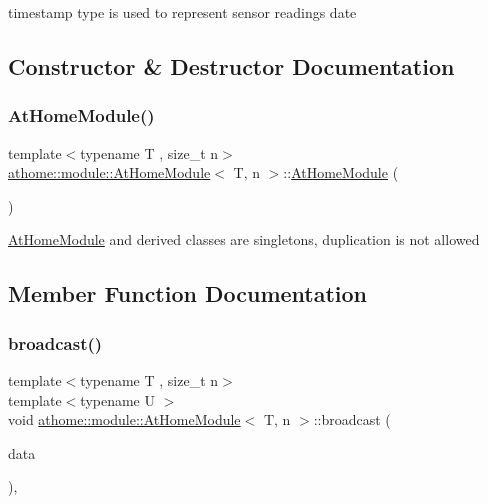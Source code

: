 {\ttfamily timestamp} type is used to represent sensor readings date 

\subsection{Constructor \& Destructor Documentation}
\mbox{\label{classathome_1_1module_1_1_at_home_module_ad78045943a579874ec16e14cf976eada}} 
\subsubsection{\texorpdfstring{At\+Home\+Module()}{AtHomeModule()}}
{\footnotesize\ttfamily template$<$typename T , size\+\_\+t n$>$ \\
\mbox{\hyperlink{classathome_1_1module_1_1_at_home_module}{athome\+::module\+::\+At\+Home\+Module}}$<$ T, n $>$\+::\mbox{\hyperlink{classathome_1_1module_1_1_at_home_module}{At\+Home\+Module}} (\begin{DoxyParamCaption}\item[{const \mbox{\hyperlink{classathome_1_1module_1_1_at_home_module}{At\+Home\+Module}}$<$ T, n $>$ \&}]{ }\end{DoxyParamCaption})\hspace{0.3cm}{\ttfamily [delete]}}

\mbox{\hyperlink{classathome_1_1module_1_1_at_home_module}{At\+Home\+Module}} and derived classes are singletons, duplication is not allowed 

\subsection{Member Function Documentation}
\mbox{\label{classathome_1_1module_1_1_at_home_module_a22f6afbe9594849ecccae5b9f4dfe47d}} 
\subsubsection{\texorpdfstring{broadcast()}{broadcast()}}
{\footnotesize\ttfamily template$<$typename T , size\+\_\+t n$>$ \\
template$<$typename U $>$ \\
void \mbox{\hyperlink{classathome_1_1module_1_1_at_home_module}{athome\+::module\+::\+At\+Home\+Module}}$<$ T, n $>$\+::broadcast (\begin{DoxyParamCaption}\item[{const U \&}]{data }\end{DoxyParamCaption})\hspace{0.3cm}{\ttfamily [inline]}, {\ttfamily [protected]}}

